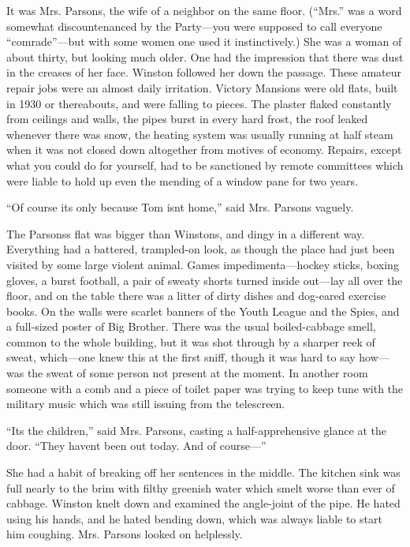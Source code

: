 It was Mrs. Parsons, the wife of a neighbor on the same floor. (``Mrs.''
was a word somewhat discountenanced by the Party---you were supposed to
call everyone ``comrade''---but with some women one used it
instinctively.) She was a woman of about thirty, but looking much older.
One had the impression that there was dust in the creases of her face.
Winston followed her down the passage. These amateur repair jobs were an
almost daily irritation. Victory Mansions were old flats, built in 1930
or thereabouts, and were falling to pieces. The plaster flaked
constantly from ceilings and walls, the pipes burst in every hard frost,
the roof leaked whenever there was snow, the heating system was usually
running at half steam when it was not closed down altogether from
motives of economy. Repairs, except what you could do for yourself, had
to be sanctioned by remote committees which were liable to hold up even
the mending of a window pane for two years.

``Of course it\textquotesingle s only because Tom isn\textquotesingle t
home,'' said Mrs. Parsons vaguely.

The Parsons\textquotesingle s flat was bigger than
Winston\textquotesingle s, and dingy in a different way. Everything had
a battered, trampled-on look, as though the place had just been visited
by some large violent animal. Games impedimenta---hockey sticks, boxing
gloves, a burst football, a pair of sweaty shorts turned inside
out---lay all over the floor, and on the table there was a litter of
dirty dishes and dog-eared exercise books. On the walls were scarlet
banners of the Youth League and the Spies, and a full-sized poster of
Big Brother. There was the usual boiled-cabbage smell, common to the
whole building, but it was shot through by a sharper reek of sweat,
which---one knew this at the first sniff, though it was hard to say
how---was the sweat of some person not present at the moment. In another
room someone with a comb and a piece of toilet paper was trying to keep
tune with the military music which was still issuing from the
telescreen.

``It\textquotesingle s the children,'' said Mrs. Parsons, casting a
half-apprehensive glance at the door. ``They haven\textquotesingle t been
out today. And of course---''

She had a habit of breaking off her sentences in the middle. The kitchen
sink was full nearly to the brim with filthy greenish water which smelt
worse than ever of cabbage. Winston knelt down and examined the
angle-joint of the pipe. He hated using his hands, and he hated bending
down, which was always liable to start him coughing. Mrs. Parsons looked
on helplessly.

